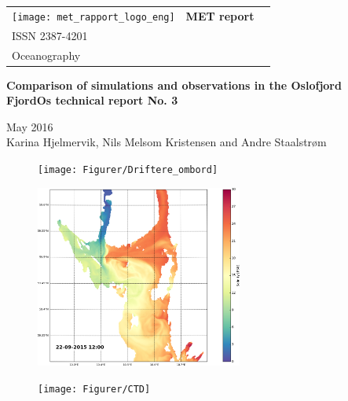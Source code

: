 \documentclass[12pt,a4paper,english]{article}
\begin{document}

%
\thispagestyle{empty}  %

\noindent
\begin{tabular}{@{} p{63mm} p{50mm} r}
\texttt{[image: met\_rapport\_logo\_eng]} %
&
\fontsize{27.5pt}{33pt} \selectfont \bf \sffamily MET{\color{gray} report}
&
 \begin{minipage}[b]{28mm}
  \begin{flushright}
   \footnotesize \sffamily No. X/2016 \\ ISSN 2387-4201 \\ Oceanography              %
  \end{flushright}
 \end{minipage}
\end{tabular}

\vspace{1.5cm}

\begin{flushright}
{\fontsize{30pt}{43.2pt}\selectfont \bf \sffamily Comparison of simulations and observations in the Oslofjord}  \\        %
{\fontsize{14.0pt}{16.8pt}\selectfont \bf \sffamily FjordOs technical report No. 3}   %

{\fontsize{12.5pt}{15pt}\selectfont \sffamily May 2016                                          %
\\
\sffamily Karina Hjelmervik, Nils Melsom Kristensen and Andre Staalstr\o m           %
}
\end{flushright}


\begin{figure}[!h]
\begin{flushleft}
\texttt{[image: Figurer/Driftere\_ombord]} \\
\end{flushleft}
\vspace{-2cm}
\begin{center}
\includegraphics*[height=6cm,angle=-4]{Python/salthold_96.png} \\
\end{center}
\vspace{-11.5cm}
\begin{flushright}
\texttt{[image: Figurer/CTD]} 
\end{flushright}
\end{figure}
\end{document}
